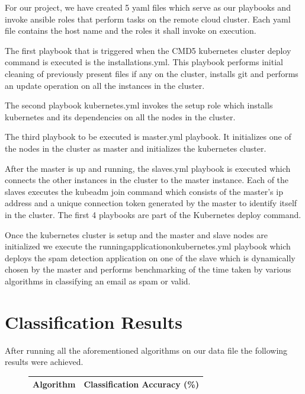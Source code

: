 \documentclass[9pt,twocolumn,twoside]{../../styles/osajnl}
\begin{document}
{\noindent
For our project, we have created 5 yaml files which serve as our
playbooks and invoke ansible roles that perform tasks on the remote
cloud cluster. Each yaml file contains the host name and the roles it
shall invoke on execution.\newline

\noindent
The first playbook that is triggered when the CMD5 kubernetes cluster
deploy command is executed is the installations.yml. This playbook
performs initial cleaning of previously present files if any on the
cluster, installs git and performs an update operation on all the
instances in the cluster.\newline

\noindent
The second playbook kubernetes.yml invokes the setup role which
installs kubernetes and its dependencies on all the nodes in the
cluster. \newline

\noindent
The third playbook to be executed is master.yml playbook. It
initializes one of the nodes in the cluster as master and initializes
the kubernetes cluster.\newline

\noindent
After the master is up and running, the slaves.yml playbook is
executed which connects the other instances in the cluster to the
master instance. Each of the slaves executes the kubeadm join command
which consists of the master's ip address and a unique connection
token generated by the master to identify itself in the cluster. The
first 4 playbooks are part of the Kubernetes deploy command.\newline

\noindent
Once the kubernetes cluster is setup and the master and slave nodes
are initialized we execute the runningapplicationonkubernetes.yml
playbook which deploys the spam detection application on one of the
slave which is dynamically chosen by the master and performs
benchmarking of the time taken by various algorithms in classifying an
email as spam or valid.

\section{Classification Results}

After running all the aforementioned algorithms on our data file the
following results were achieved.

\begin{figure}[ht]
\begin{center}
 \begin{tabular}{|c | c|} 
 \hline
Algorithm  & Classification Accuracy (\%) \\ [0.5ex] 
 \hline\hline
    

\end{tabular}
\end{center}
\end{figure}}
\end{document}

